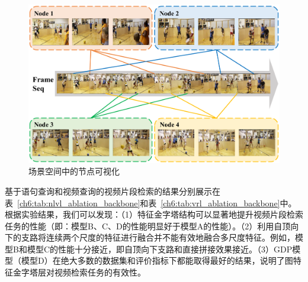 \begin{figure}[t]
    \centering
    \includegraphics[width=0.9\linewidth]{chapter6/res/node_visualization.pdf}
    \caption{场景空间中的节点可视化}
    \label{ch6:fig:node_visualization}
\end{figure}

基于语句查询和视频查询的视频片段检索的结果分别展示在表~\ref{ch6:tab:nlvl_ablation_backbone}和表~\ref{ch6:tab:vrl_ablation_backbone}中。根据实验结果，我们可以发现：（1）特征金字塔结构可以显著地提升视频片段检索任务的性能（即：模型B、C、D的性能明显好于模型A的性能）。（2）利用自顶向下的支路将连续两个尺度的特征进行融合并不能有效地融合多尺度特征。例如，模型B和模型C的性能十分接近，即自顶向下支路和直接拼接效果接近。（3）GDP模型（模型D）在绝大多数的数据集和评价指标下都能取得最好的结果，说明了图特征金字塔层对视频检索任务的有效性。


